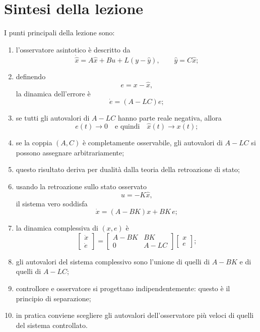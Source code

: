 \section{Sintesi della lezione}

I punti principali della lezione sono:
\begin{enumerate}
    \item l'osservatore asintotico è descritto da
    \[
    \dot{\hat x}=A\hat x+Bu+L(y-\hat y),
    \qquad
    \hat y=C\hat x;
    \]

    \item definendo
    \[
    e=x-\hat x,
    \]
    la dinamica dell'errore è
    \[
    \dot e=(A-LC)e;
    \]

    \item se tutti gli autovalori di \(A-LC\) hanno parte reale negativa,
    allora
    \[
    e(t)\to 0
    \quad\text{e quindi}\quad
    \hat x(t)\to x(t);
    \]

    \item se la coppia \((A,C)\) è completamente osservabile, gli autovalori di \(A-LC\)
    si possono assegnare arbitrariamente;

    \item questo risultato deriva per dualità dalla teoria della retroazione di stato;

    \item usando la retroazione sullo stato osservato
    \[
    u=-K\hat x,
    \]
    il sistema vero soddisfa
    \[
    \dot x=(A-BK)x + BK\,e;
    \]

    \item la dinamica complessiva di \((x,e)\) è
    \[
    \begin{bmatrix}
    \dot x\\
    \dot e
    \end{bmatrix}
    =
    \begin{bmatrix}
    A-BK & BK\\
    0 & A-LC
    \end{bmatrix}
    \begin{bmatrix}
    x\\
    e
    \end{bmatrix};
    \]

    \item gli autovalori del sistema complessivo sono l'unione di quelli di \(A-BK\)
    e di quelli di \(A-LC\);

    \item controllore e osservatore si progettano indipendentemente:
    questo è il principio di separazione;

    \item in pratica conviene scegliere gli autovalori dell'osservatore più veloci
    di quelli del sistema controllato.
\end{enumerate}